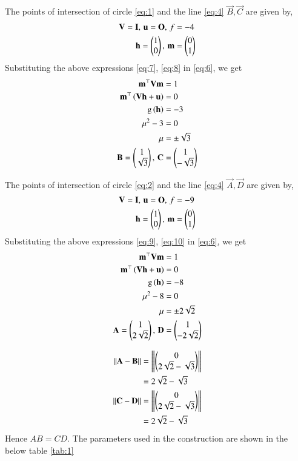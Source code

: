 \documentclass[journal,12pt,twocolumn]{IEEEtran}
\begin{document}
\begin{enumerate}
The points of intersection of circle \eqref{eq:1} and the line \eqref{eq:4} $\vec{B},\vec{C}$ are given by,
\begin{align}
\mathbf{V} = \mathbf{I}, \, \mathbf{u} = \mathbf{O}, \, f &= -4
\label{eq:7}\\
\mathbf{h} = \begin{pmatrix}1\\0\end{pmatrix}, \, \mathbf{m} &= \begin{pmatrix}0\\1\end{pmatrix}
\label{eq:8}
\end{align} 
Substituting the above expressions \eqref{eq:7}, \eqref{eq:8} in \eqref{eq:6}, we get
\begin{align}
\mathbf{m}^{\top}\mathbf{V}\mathbf{m} & = 1\\
\mathbf{m}^{\top}\left(\mathbf{V}\mathbf{h}+\mathbf{u}\right) &= 0 \\
\text{g}\left(\mathbf{h}\right) &= -3\\
\mu ^2 - 3 &= 0\\
\mu &= \pm \sqrt{3}\\
\mathbf{B} = \begin{pmatrix}1\\\sqrt{3}\end{pmatrix}, \, \mathbf{C} &= \begin{pmatrix}1\\-\sqrt{3}\end{pmatrix}
\end{align}

The points of intersection of circle \eqref{eq:2} and the line \eqref{eq:4} $\vec{A},\vec{D}$ are given by,
\begin{align}
\mathbf{V} = \mathbf{I}, \, \mathbf{u} = \mathbf{O}, \, f &= -9
\label{eq:9}\\
\mathbf{h} = \begin{pmatrix}1\\0\end{pmatrix}, \, \mathbf{m} &= \begin{pmatrix}0\\1\end{pmatrix}
\label{eq:10}
\end{align} 
Substituting the above expressions \eqref{eq:9}, \eqref{eq:10} in \eqref{eq:6}, we get
\begin{align}
\mathbf{m}^{\top}\mathbf{V}\mathbf{m} & = 1\\
\mathbf{m}^{\top}\left(\mathbf{V}\mathbf{h}+\mathbf{u}\right) &= 0 \\
\text{g}\left(\mathbf{h}\right) &= -8\\
\mu ^2 - 8 &= 0\\
\mu &= \pm 2\sqrt{2}\\
\mathbf{A} = \begin{pmatrix}1\\2\sqrt{2}\end{pmatrix}, \, \mathbf{D} &= \begin{pmatrix}1\\-2\sqrt{2}\end{pmatrix}
\end{align}

\begin{align}
\left\lVert\mathbf{A}-\mathbf{B}\right\rVert &= \left\lVert\begin{pmatrix}0 \\ 2\sqrt{2}-\sqrt{3}\end{pmatrix}\right\rVert\\
&=  2\sqrt{2}-\sqrt{3}\\
\left\lVert\mathbf{C}-\mathbf{D}\right\rVert &= \left\lVert\begin{pmatrix}0 \\ 2\sqrt{2}-\sqrt{3}\end{pmatrix}\right\rVert\\
&=  2\sqrt{2}-\sqrt{3}
\end{align}
Hence $AB = CD$.
The parameters used in the construction are shown in the below table \ref{tab:1}

\begin{table}[h]
\centering

\caption{}
\label{tab:1}
\end{table}
\end{enumerate}
\end{document}
